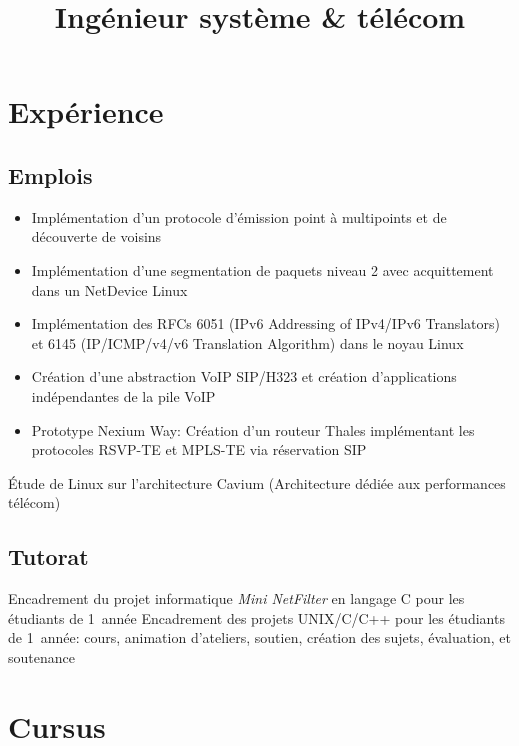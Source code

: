 \documentclass[11pt, a4paper]{moderncv}
\title{\textbf{Ingénieur système \& télécom}}
\begin{document}
\maketitle

\section{Expérience}
\subsection{Emplois}
{
  \begin{itemize}
    \renewcommand{\labelitemi}{$\bullet$  }
    \item Implémentation d'un protocole d'émission point \`a multipoints et de découverte de voisins
    \item Implémentation d'une segmentation de paquets niveau 2 avec acquittement dans un NetDevice
	Linux
    \item Implémentation des RFCs 6051 (IPv6 Addressing of IPv4/IPv6 Translators) et 6145 (IP/ICMP/v4/v6
	Translation Algorithm) dans le noyau Linux
    \item Création d'une abstraction VoIP SIP/H323 et création d'applications indépendantes de la
	pile VoIP
    \item Prototype Nexium Way: Création d'un routeur Thales implémentant les protocoles RSVP-TE et
	MPLS-TE via réservation SIP
  \end{itemize}
}
{
  Étude de Linux sur l'architecture Cavium (Architecture dédiée aux performances télécom)
}

\subsection{Tutorat}
	      {Encadrement du projet informatique \textit{Mini NetFilter} en langage C pour les étudiants
		de 1\iere\ année}
	      {Encadrement des projets UNIX/C/C++ pour les étudiants de 1\iere\ année: cours,
		animation d'ateliers, soutien, création des sujets, évaluation, et soutenance}


\section{Cursus}
\end{document}
